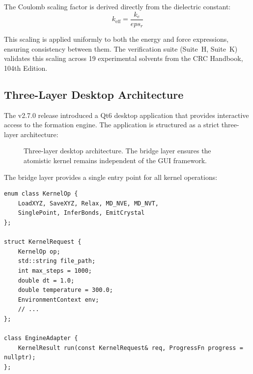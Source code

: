 \documentclass[11pt,twoside]{article}
\def\varepsilon{eps}%
\begin{document}
The Coulomb scaling factor is derived directly from the dielectric constant:
\begin{equation}
  k_{\mathrm{eff}} = \frac{k_e}{\varepsilon_r}
  \label{eq:k-eff}
\end{equation}

This scaling is applied uniformly to both the energy and force expressions, ensuring consistency between them. The verification suite (Suite~H, Suite~K) validates this scaling across 19 experimental solvents from the CRC Handbook, 104th Edition.

\subsection{Three-Layer Desktop Architecture}
\label{sec:desktop-arch}

The v2.7.0 release introduced a Qt6 desktop application that provides interactive access to the formation engine. The application is structured as a strict three-layer architecture:

\begin{figure}[H]
\centering
{}
\caption{Three-layer desktop architecture. The bridge layer ensures the atomistic kernel remains independent of the GUI framework.}
\label{fig:three-layer}
\end{figure}

The bridge layer provides a single entry point for all kernel operations:

\begin{lstlisting}
enum class KernelOp {
    LoadXYZ, SaveXYZ, Relax, MD_NVE, MD_NVT,
    SinglePoint, InferBonds, EmitCrystal
};

struct KernelRequest {
    KernelOp op;
    std::string file_path;
    int max_steps = 1000;
    double dt = 1.0;
    double temperature = 300.0;
    EnvironmentContext env;
    // ...
};

class EngineAdapter {
    KernelResult run(const KernelRequest& req, ProgressFn progress = nullptr);
};
\end{lstlisting}
\end{document}
